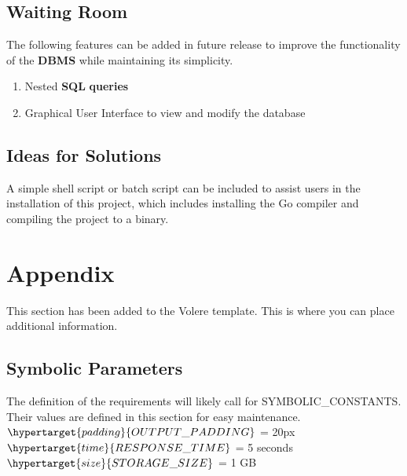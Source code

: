 \documentclass[12pt, titlepage]{article}
\begin{document}
\subsection{Waiting Room}

The following features can be added in future release to improve the functionality of the \textbf{DBMS} while maintaining its simplicity.

\begin{enumerate}[{FR}1.]
    \item Nested \textbf{SQL} \textbf{queries}
    \item Graphical User Interface to view and modify the database
\end{enumerate}

\subsection{Ideas for Solutions}

A simple shell script or batch script can be included to assist users in the installation of this project, which includes installing the Go compiler and compiling the project to a binary.





\newpage

\section{Appendix}

This section has been added to the Volere template.  This is where you can place
additional information.

\subsection{Symbolic Parameters}

The definition of the requirements will likely call for SYMBOLIC\_CONSTANTS.
Their values are defined in this section for easy maintenance.\\

\noindent $\hypertarget{padding}{OUTPUT\_PADDING}$ = 20px \\
\noindent $\hypertarget{time}{RESPONSE\_TIME}$ = 5 seconds \\
\noindent $\hypertarget{size}{STORAGE\_SIZE}$ = 1 GB\\
\end{document}
